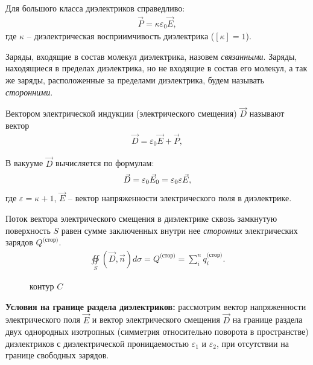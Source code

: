 \documentclass[__main__.tex]{subfiles}
\begin{document}
Для большого класса диэлектриков справедливо:
\begin{gather}
\vec{P} = \kappa\varepsilon_0\vec{E},
\end{gather}
где $\kappa$ -- диэлектрическая восприимчивость диэлектрика ($[\kappa]=1$).

Заряды, входящие в состав молекул диэлектрика, назовем \emph{связанными}. Заряды, находящиеся в пределах диэлектрика, но не входящие в состав его молекул, а так же заряды, расположенные за пределами диэлектрика, будем называть \emph{сторонними}.

\begin{definition}
Вектором электрической индукции (электрического смещения) $\vec{D}$ называют вектор
\begin{gather}
\vec{D} = \varepsilon_0\vec{E}+\vec{P},
\end{gather}
\end{definition}

В вакууме $\vec{D}$ вычисляется по формулам:
\begin{gather}
\vec{D} = \varepsilon_0\vec{E}_0 = \varepsilon_0\varepsilon\vec{E},\llabel{eq:deq}
\end{gather}
где $\varepsilon=\kappa+1$, $\vec{E}$ -- вектор напряженности электрического поля в диэлектрике.

\begin{theorem}
Поток вектора электрического смещения в диэлектрике сквозь замкнутую поверхность $S$ равен сумме заключенных внутри нее \emph{сторонних} электрических зарядов $Q^{\text{(стор)}}$.
\begin{gather}
\oiint\limits_{S}(\vec{D},\vec{n})d\sigma = Q^{\text{(стор)}} = \sum_{i}^{n}q_i^{\text{(стор)}}.
\end{gather}
\end{theorem}

\begin{wrapfigure}{r}{.3\linewidth}
\centering
\def\svgwidth{1\linewidth}

\caption{контур $C$}
\end{wrapfigure}

\textbf{Условия на границе раздела диэлектриков:} рассмотрим вектор напряженности электрического поля $\vec{E}$ и вектор электрического смещения $\vec{D}$ на границе раздела двух однородных изотропных (симметрия относительно поворота в пространстве) диэлектриков с диэлектрической проницаемостью $\varepsilon_1$ и $\varepsilon_2$, при отсутствии на границе свободных зарядов.
\end{document}
